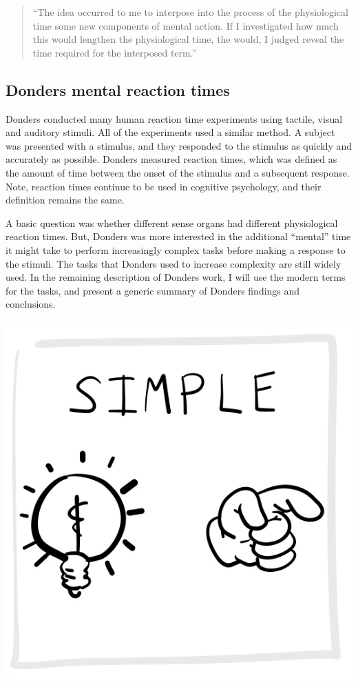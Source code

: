 \documentclass[
  oneside,
  12pt]{crumpbook}
\newenvironment{floatright25}{%
  \wrapfigure{R}{.25\textwidth}%
  }{%
  \endwrapfigure}
\begin{document}
\begin{quote}
``The idea occurred to me to interpose into the process of the physiological time some new components of mental action. If I investigated how much this would lengthen the physiological time, the would, I judged reveal the time required for the interposed term.''
\end{quote}

\hypertarget{donders-mental-reaction-times}{%
\subsection{Donders mental reaction times}\label{donders-mental-reaction-times}}

Donders conducted many human reaction time experiments using tactile, visual and auditory stimuli. All of the experiments used a similar method. A subject was presented with a stimulus, and they responded to the stimulus as quickly and accurately as possible. Donders measured reaction times, which was defined as the amount of time between the onset of the stimulus and a subsequent response. Note, reaction times continue to be used in cognitive psychology, and their definition remains the same.

A basic question was whether different sense organs had different physiological reaction times. But, Donders was more interested in the additional ``mental'' time it might take to perform increasingly complex tasks before making a response to the stimuli. The tasks that Donders used to increase complexity are still widely used. In the remaining description of Donders work, I will use the modern terms for the tasks, and present a generic summary of Donders findings and conclusions.

\begin{floatright25}
\includegraphics[width=1\linewidth]{imgs/Donders_simple}

\end{floatright25}
\end{document}
